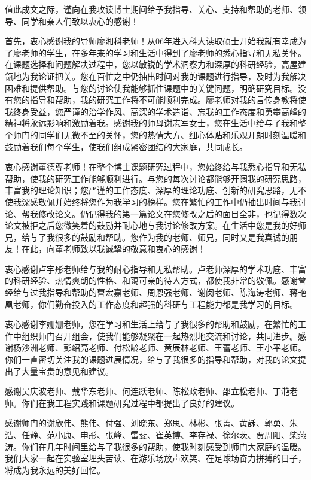 
\begin{ack}
值此成文之际，谨向在我攻读博士期间给予我指导、关心、支持和帮助的老师、领导、同学和亲人们致以衷心的感谢！

首先，衷心感谢我的导师廖湘科老师！从06年进入科大读取硕士开始我就有幸成为了廖老师的学生，在多年来的学习和生活中得到了廖老师的悉心指导和无私关怀。在课题选择和问题解决过程中，您以敏锐的学术洞察力和深厚的科研经验，高屋建瓴地为我论证把关。您在百忙之中仍抽出时间对我的课题进行指导，及时为我解决困难和提供帮助。与您的讨论使我能够抓住课题中的关键问题，明确研究目标。没有您的指导和帮助，我的研究工作将不可能顺利完成。廖老师对我的言传身教将使我终身受益，您严谨的治学作风、高深的学术造诣、忘我的工作态度和勇攀高峰的精神将永远影响和激励着我。感谢我的师母谢志军女士，您在生活中给与了我和整个师门的同学们无微不至的关怀，您的热情大方、细心体贴和乐观开朗时刻温暖和鼓励着我们每个学生，使我们组成紧密团结的大家庭，共同成长。

衷心感谢董德尊老师！在整个博士课题研究过程中，您始终给与我悉心指导和无私帮助，使我的研究工作能够顺利进行。与您的每次讨论都能够开阔我的研究思路，丰富我的理论知识；您严谨的工作态度、深厚的理论功底、创新的研究思路，无不使我深感敬佩并始终将您作为我学习的榜样。您在繁忙的工作中仍抽出时间与我讨论、帮我修改论文。仍记得我的第一篇论文在您修改之后的面目全非，也记得数次论文被拒之后您微笑着的鼓励并耐心地与我讨论修改方案。在生活中您是我的好师兄，给与了我很多的鼓励和帮助。您作为我的老师、师兄，同时又是我真诚的朋友！在此，向董老师致以我诚挚的敬意和衷心的感谢！

衷心感谢卢宇彤老师给与我的耐心指导和无私帮助。卢老师深厚的学术功底、丰富的科研经验、热情爽朗的性格、和蔼可亲的待人方式，都使我非常的敬佩。感谢曾经给与过我指导和帮助的曹宏嘉老师、周恩强老师、谢闵老师、陈海涛老师、蒋艳凰老师，你们勤奋投入的工作态度和超强的科研与工程能力都是我学习的目标。

衷心感谢李姗姗老师，您在学习和生活上给与了我很多的帮助和鼓励，在繁忙的工作中组织师门召开组会，使我们能够凝聚在一起热烈地交流和讨论，共同进步。感谢杨沙洲老师、彭绍亮老师、付松龄老师、黄辰林老师、王蕾老师、王小平老师。你们一直密切关注我的课题进展情况，给与了我很多的指导和帮助，对我的论文提出了大量宝贵的意见和建议。

感谢吴庆波老师、戴华东老师、何连跃老师、陈松政老师、邵立松老师、丁滟老师。你们在我工程实践和课题研究过程中都提出了良好的建议。

感谢师门的谢欣伟、熊伟、付强、刘晓东、郑思、林彬、张菁、黄訸、郭勇、朱浩、任静、范小康、申彤、张峰、雷斐、崔英博、李存禄、徐尔茨、贾周阳、柴燕涛。你们在几年时间里给与了我很多的帮助，使我时刻感受到师门大家庭的温暖。我们大家一起在实验室埋头苦读、在游乐场放声欢笑、在足球场奋力拼搏的日子，将成为我永远的美好回忆。


\end{ack}
